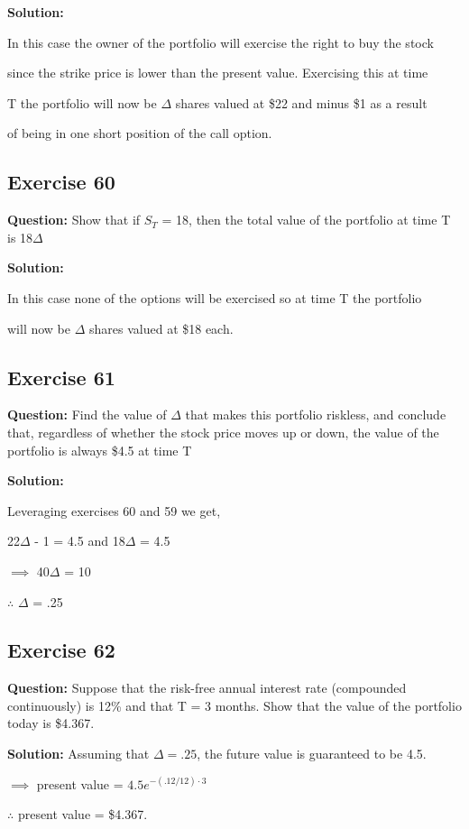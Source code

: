 \documentclass{article}
\begin{document}
\textbf{Solution:}

In this case the owner of the portfolio will exercise the right to buy the stock 

since the strike price is lower than the present value. Exercising this at time 

T the portfolio will now be $\Delta$ shares valued at \$22 and minus \$1 as a result 

of being in one short position of the call option.


\subsection*{Exercise 60}
\textbf{Question:} Show that if $S_T$ = 18, then the total value of the portfolio at time T is 18$\Delta$ 

\textbf{Solution:}

In this case none of the options will be exercised so at time T the portfolio 

will now be $\Delta$ shares valued at \$18 each.

\subsection*{Exercise 61}
\textbf{Question:} Find the value of $\Delta$ that makes this portfolio riskless, and conclude that, regardless of whether the stock price moves up or down, the value of the portfolio is always \$4.5 at time T  

\textbf{Solution:}

Leveraging exercises 60 and 59 we get,

22$\Delta$ - 1 = 4.5 and 18$\Delta$ = 4.5

$\implies$ 40$\Delta$ = 10 

$\therefore$ $\Delta$ = .25

\subsection*{Exercise 62}
\textbf{Question:} Suppose that the risk-free annual interest rate (compounded continuously) is 12\% and that T = 3 months. Show that the value of the portfolio today is \$4.367.

\textbf{Solution:}
Assuming that $\Delta = .25$, the future value is guaranteed to be 4.5.

$\implies$ present value = $4.5e^{-(.12/12) \cdot 3}$

$\therefore$ present value = \$4.367.
\end{document}
